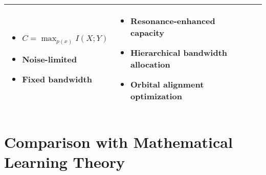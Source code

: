 \begin{center}
\begin{tabular}{|p{3cm}|p{5cm}|p{5cm}|}
\begin{itemize}
    \item $C = \max_{p(x)} I(X;Y)$
    \item Noise-limited
    \item Fixed bandwidth
\end{itemize} &
\begin{itemize}
    \item Resonance-enhanced capacity
    \item Hierarchical bandwidth allocation
    \item Orbital alignment optimization
\end{itemize} \\
\hline
\end{tabular}
\label{tab:information_comparison}
\end{center}

\section{Comparison with Mathematical Learning Theory}

